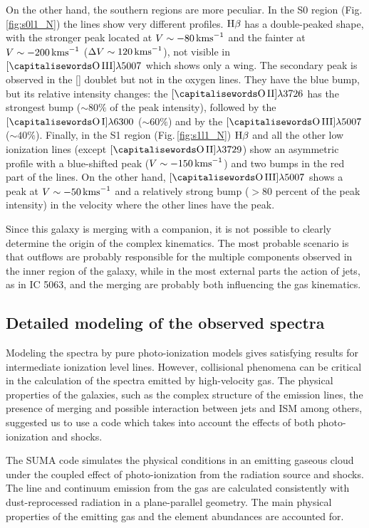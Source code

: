 \documentclass[../main.tex]{subfiles}
\begin{document}
On the other hand, the southern regions are more peculiar.
In the S0 region (Fig.\,\ref{fig:s0l1_N}) the lines show very different profiles.
$\Hb$ has a double-peaked shape, with the stronger peak located at $V\sim-80\,\si{\kms}$ and the fainter at $V\sim-200\,\si{\kms}$ ($\Delta V\sim 120\,\si{\kms}$), not visible in $[\rm\ion{O}{III}]\lambda5007$ which shows only a wing.
The secondary peak is observed in the [] doublet but not in the oxygen lines.
They have the blue bump, but its relative intensity changes: the $[\rm\ion{O}{II}]\lambda3726$ has the strongest bump ($\sim80\%$ of the peak intensity), followed by the $[\rm\ion{O}{I}]\lambda6300$ ($\sim60\%$) and by the $[\rm\ion{O}{III}]\lambda5007$ ($\sim40\%$).
Finally, in the S1 region (Fig.\,\ref{fig:s1l1_N}) $\Hb$ and all the other low ionization lines (except $[\rm\ion{O}{II}]\lambda3729$) show an asymmetric profile with a blue-shifted peak ($V\sim-150\,\si{\kms}$) and two bumps in the red part of the lines.
On the other hand, $[\rm\ion{O}{III}]\lambda5007$ shows a peak at $V\sim -50\,\si{\kms}$ and a relatively strong bump ($>80$ percent of the peak intensity) in the velocity where the other lines have the peak.

Since this galaxy is merging with a companion, it is not possible to clearly determine the origin of the complex kinematics.
The most probable scenario is that outflows are probably responsible for the multiple components observed in the inner region of the galaxy, while in the most external parts the action of jets, as in IC 5063, and the merging are probably both influencing the gas kinematics. 

\subsection{Detailed modeling of the observed spectra}
\label{sec:models}


Modeling the spectra by pure photo-ionization models gives satisfying results for intermediate ionization level lines.
However, collisional phenomena can be critical in the calculation of the spectra emitted by high-velocity gas.
The physical properties of the galaxies, such as the complex structure of the emission lines, the presence of merging and possible interaction between jets and ISM among others, suggested us to use a code which takes into account the effects of both photo-ionization and shocks.

The SUMA code \citep[][and references therein]{Contini15} simulates the physical conditions in an emitting gaseous cloud under the coupled effect of photo-ionization from the radiation source and shocks. The line and continuum emission from the gas are calculated consistently with dust-reprocessed radiation in a plane-parallel geometry.
The main physical properties of the emitting gas and the element abundances are accounted for.
\end{document}
